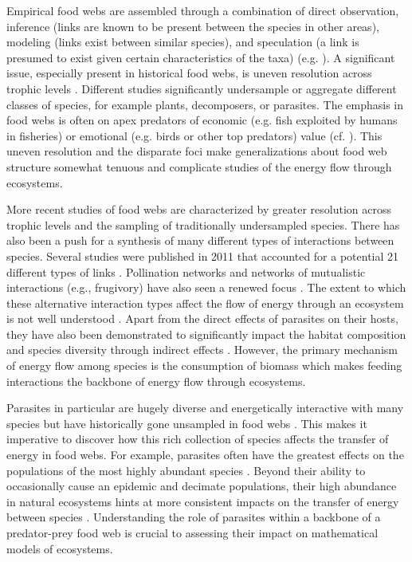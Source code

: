 \documentclass[../dissertation.tex]{subfiles}
\begin{document}
\begin{bibunit}
Empirical food webs are assembled through a combination of direct observation,
inference (links are known to be present between the species in other areas),
modeling (links exist between similar species), and speculation (a link is
presumed to exist given certain characteristics of the taxa) (e.g.
\cite*{Hechinger2011a}). A significant issue, especially present in historical
food webs, is uneven resolution across trophic levels \cite*{Martinez1993}. Different studies
significantly undersample or aggregate different classes of species, for
example plants, decomposers, or parasites.  The emphasis in food webs is often
on apex predators of economic (e.g. fish exploited by humans in fisheries) or
emotional (e.g. birds or other top predators) value (cf.
\cite*{Yodzis1998,Pikitch2004,Koehn2016}). This uneven resolution and
the disparate foci make generalizations about food web structure somewhat
tenuous and complicate studies of the energy flow through ecosystems.

More recent studies of food webs are characterized by greater resolution across
trophic levels and the sampling of traditionally undersampled species. There
has also been a push for a synthesis of many different types of interactions
between species. Several studies were published in 2011 that accounted for a
potential 21 different types of links \cite*{Hechinger2011a, Mouritsen2011,
Zander2011, Thieltges2011}. Pollination networks and networks of mutualistic
interactions (e.g., frugivory) have also seen a renewed focus
\cite*{Olesen2002,Bascompte2003,Olesen2007,Jordano2003}. The extent to
which these alternative interaction types affect the flow of energy through an
ecosystem is not well understood \cite*{Lafferty2006}. Apart from the direct
effects of parasites on their hosts, they have also been demonstrated to
significantly impact the habitat composition and species diversity through
indirect effects \cite*{Mouritsen2010, Wood2007, Dunn2012}. However, the primary
mechanism of energy flow among species is the consumption of biomass which
makes feeding interactions the backbone of energy flow through ecosystems.

Parasites in particular are hugely diverse and energetically interactive with
many species but have historically gone unsampled in food webs
\cite*{Lafferty2008}. This makes it imperative to discover how this rich
collection of species affects the transfer of energy in food webs. For example,
parasites often have the greatest effects on the populations of the most highly
abundant species \cite*{Gartazar2006, Rossi2005, Vicente2004}. Beyond their
ability to occasionally cause an epidemic and decimate populations, their high
abundance in natural ecosystems hints at more consistent impacts on the
transfer of energy between species \cite*{Whitney2008, Lettini2009}.
Understanding the role of parasites within a backbone of a predator-prey food
web is crucial to assessing their impact on mathematical models of ecosystems.


\end{bibunit}
\end{document}
